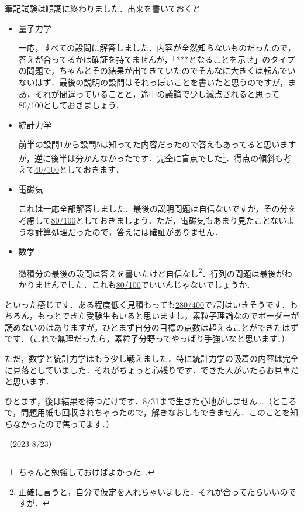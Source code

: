 \documentclass[a4paper,pdflatex,ja=standard]{bxjsarticle}
\begin{document}
筆記試験は順調に終わりました．出来を書いておくと
\begin{itemize}
  \item 
  量子力学

  一応，すべての設問に解答しました．内容が全然知らないものだったので，答えが合ってるかは確証を持てませんが，「***となることを示せ」のタイプの問題で，ちゃんとその結果が出てきていたのでそんなに大きくは転んでいないはず．最後の説明の設問はそれっぽいことを書いたと思うのですが，まあ，それが間違っていることと，途中の議論で少し減点されると思って\uline{80/100}としておきましょう．

  \item
  統計力学

  前半の設問1から設問5は知ってた内容だったので答えもあってると思いますが，逆に後半は分かんなかったです．完全に盲点でした\footnote{
    ちゃんと勉強しておけばよかった...
  }．得点の傾斜も考えて\uline{40/100}としておきます．

  \item 
  電磁気

  これは一応全部解答しました．最後の説明問題は自信ないですが，その分を考慮して\uline{80/100}としておきましょう．ただ，電磁気もあまり見たことないような計算処理だったので，答えには確証がありません．

  \item
  数学

  微積分の最後の設問は答えを書いたけど自信なし\footnote{
    正確に言うと，自分で仮定を入れちゃいました．それが合ってたらいいのですが．
  }．行列の問題は最後がわかりませんでした．これも\uline{80/100}でいいんじゃないでしょうか．
\end{itemize}
といった感じです．ある程度低く見積もっても\uline{280/400}で7割はいきそうです．もちろん，もっとできた受験生もいると思いますし，素粒子理論なのでボーダーが読めないのはありますが，ひとまず自分の目標の点数は超えることができたはずです．（これで無理だったら，素粒子分野ってやっぱり手強いなと思います．）

ただ，数学と統計力学はもう少し戦えました．特に統計力学の吸着の内容は完全に見落としていました．それがちょっと心残りです．できた人がいたらお見事だと思います．

ひとまず，後は結果を待つだけです．8/31まで生きた心地がしません...（ところで，問題用紙も回収されちゃったので，解きなおしもできません．このことを知らなかったので焦ってます．）
\begin{flushright}
  （2023 8/23）  
\end{flushright}
\end{document}
